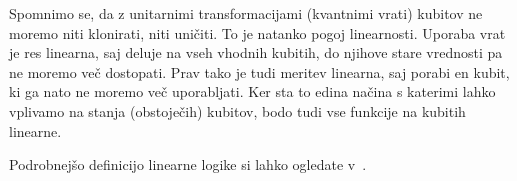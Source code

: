 Spomnimo se, da z unitarnimi transformacijami (kvantnimi vrati) kubitov ne moremo niti klonirati, niti uničiti.
To je natanko pogoj linearnosti.
Uporaba vrat je res linearna, saj deluje na vseh vhodnih kubitih, do njihove stare vrednosti pa ne moremo več dostopati.
Prav tako je tudi meritev linearna, saj porabi en kubit, ki ga nato ne moremo več uporabljati.
Ker sta to edina načina s katerimi lahko vplivamo na stanja (obstoječih) kubitov, bodo tudi vse funkcije na kubitih linearne.

Podrobnejšo definicijo linearne logike si lahko ogledate v~\cite{girard-linear-logic-1987,girard-linear-logic-1995, nlab:linear_logic}.



